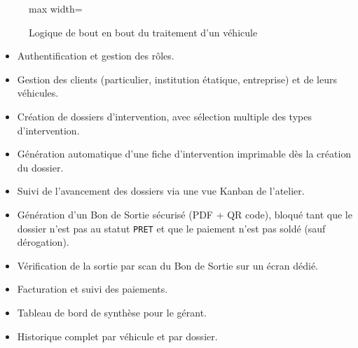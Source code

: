 \documentclass[11pt,a4paper]{report}
\begin{document}
\begin{figure}[h!]
\centering
\begin{adjustbox}{max width=\linewidth}
\end{adjustbox}
\caption{Logique de bout en bout du traitement d'un véhicule}
\end{figure}

\begin{itemize}[leftmargin=1cm]
\item Authentification et gestion des rôles.
\item Gestion des clients (particulier, institution étatique, entreprise) et de leurs véhicules.
\item Création de dossiers d'intervention, avec sélection multiple des types d'intervention.
\item Génération automatique d'une fiche d'intervention imprimable dès la création du dossier.
\item Suivi de l'avancement des dossiers via une vue Kanban de l'atelier.
\item Génération d'un Bon de Sortie sécurisé (PDF + QR code), bloqué tant que le dossier
      n'est pas au statut \texttt{PRET} et que le paiement n'est pas soldé (sauf dérogation).
\item Vérification de la sortie par scan du Bon de Sortie sur un écran dédié.
\item Facturation et suivi des paiements.
\item Tableau de bord de synthèse pour le gérant.
\item Historique complet par véhicule et par dossier.
\end{itemize}
\end{document}
